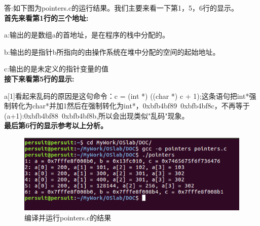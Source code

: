 \documentclass[]{ctexrep}
\begin{document}
答:如下图为pointers.c的运行结果。我们主要来看一下第1，5，6行的显示。\\
\textbf{首先来看第1行的三个地址:}\par
a:输出的是数组a的首地址，是在程序的栈中分配的。\par
b:输出的是指针b所指向的由操作系统在堆中分配的空间的起始地址。\par
c:输出的是未定义的指针变量的值\\
\textbf{接下来看第5行的显示:}\par
a[1]看起来乱码的原因是这句命令：c = (int *) ((char *) c + 1);这条语句把int*强制转化为char*并加1然后在强制转化为int*，0xbfb4bf89~0xbfb4bf8c，不再等于(a+1):0xbfb4bf88~0xbfb4bf8b,所以会出现类似"乱码"现象。\\
\textbf{最后第6行的显示参考以上分析。}\\

\begin{figure}[htbp!]
	\centering\includegraphics[scale=0.8]{figure/pointers}
	\caption{编译并运行pointers.c的结果}
\end{figure}
\end{document}
